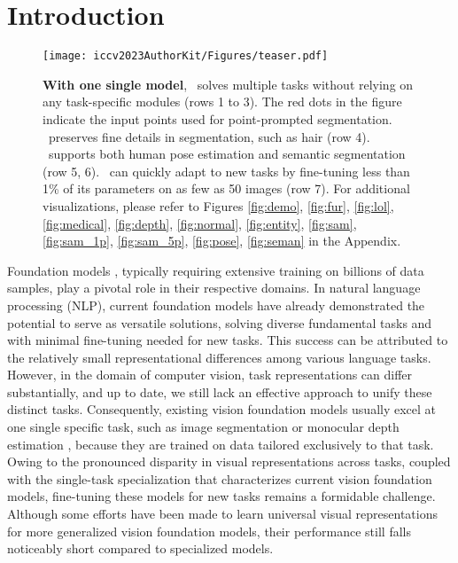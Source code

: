 \section{Introduction}

\begin{figure*}[htbp]
  \centering
  \texttt{[image: iccv2023AuthorKit/Figures/teaser.pdf]}
  \caption{
  \textbf{With one single model}, \oursbf\ 
  solves 
  multiple tasks 
  without relying on any task-specific modules (rows 1 to 3). The red dots in the figure indicate the input points used for point-prompted segmentation. \ours\ preserves fine details in segmentation, such as hair (row 4). \ours\ supports both human pose estimation and semantic segmentation (row 5, 6). \ours\ can quickly adapt to new tasks by fine-tuning less than 1\% of its parameters on as few as 50 images (row 7). For additional visualizations, please refer to Figures 
  \ref{fig:demo}, 
  \ref{fig:fur}, 
  \ref{fig:lol}, 
  \ref{fig:medical}, 
  \ref{fig:depth},
\ref{fig:normal},
\ref{fig:entity},
\ref{fig:sam},
\ref{fig:sam_1p},
\ref{fig:sam_5p},
\ref{fig:pose},
\ref{fig:seman} in the Appendix.
  }
  \label{fig:teaser}
\end{figure*}

Foundation models \cite{kirillov2023segment, ravi2024sam, yang2024depth, yang2024depth2, yang2024depthvideo, carion2020end, bochkovskii2024depth, radford2021learning, oquab2023dinov2, rombach2022high, blattmann2023stable, he2022masked}, typically requiring extensive training on billions of data samples, play a pivotal role in their respective domains. In natural language processing (NLP), current foundation models \cite{brown2020language, touvron2023llama, touvron2023llama2, dubey2024llama} have already demonstrated the potential to serve as versatile solutions, 
solving diverse fundamental 
tasks and with minimal fine-tuning needed for new tasks. This success can be attributed to the relatively small representational differences among various language tasks. However, in the domain of computer vision, task representations can differ substantially, and up to date, we %
still 
lack an effective approach to unify these distinct tasks.
Consequently, existing vision foundation models usually excel at one single specific task, such as image segmentation \cite{kirillov2023segment, ravi2024sam} or monocular depth estimation \cite{yang2024depth, yang2024depth2, yang2024depthvideo}, because they are trained on data tailored exclusively to that task.  
Owing to the pronounced disparity in visual representations across tasks, coupled with the single-task specialization that characterizes current vision foundation models, fine-tuning these models for new tasks remains a formidable challenge.
Although some efforts \cite{caron2021emerging, oquab2023dinov2, he2022masked, ren2024dino} have been made to learn universal visual representations for more generalized vision foundation models, their performance still falls noticeably short compared to specialized models.


